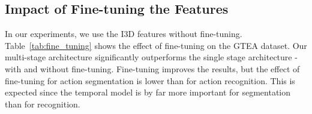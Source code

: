\documentclass[10pt,twocolumn,letterpaper]{article}
\begin{document}
\subsection{Impact of Fine-tuning the Features}
In our experiments, we use the I3D features without fine-tuning. Table~\ref{tab:fine_tuning} 
shows the effect of fine-tuning on the GTEA dataset. Our multi-stage architecture 
significantly outperforms the single stage architecture - with and without fine-tuning. 
Fine-tuning improves the results, but the effect of fine-tuning for action segmentation is 
lower than for action recognition. This is expected since the temporal model is by far 
more important for segmentation than for recognition.

\begin{table}[ht]
\centering
{}
\caption{Effect of fine-tuning on the GTEA dataset.}
\label{tab:fine_tuning}
\end{table}
\end{document}
